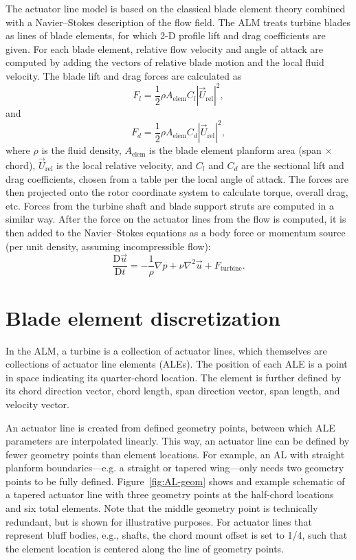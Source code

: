 The actuator line model is based on the classical blade element theory combined
with a Navier--Stokes description of the flow field. The ALM treats turbine
blades as lines of blade elements, for which 2-D profile lift and drag
coefficients are given. For each blade element, relative flow velocity and angle
of attack are computed by adding the vectors of relative blade motion and the
local fluid velocity. The blade lift and drag forces are calculated as
\begin{equation}
    F_l = \frac{1}{2} \rho A_\mathrm{elem} C_l |\vec{U}_\mathrm{rel}|^2,
\end{equation}
and
\begin{equation}
    F_d = \frac{1}{2} \rho A_\mathrm{elem} C_d |\vec{U}_\mathrm{rel}|^2,
\end{equation}
where $\rho$ is the fluid density, $A_\mathrm{elem}$ is the blade element
planform area (span $\times$ chord), $\vec{U}_\mathrm{rel}$ is the local
relative velocity, and $C_l$ and $C_d$ are the sectional lift and drag
coefficients, chosen from a table per the local angle of attack. The forces are
then projected onto the rotor coordinate system to calculate torque, overall
drag, etc. Forces from the turbine shaft and blade support struts are computed
in a similar way. After the force on the actuator lines from the flow is
computed, it is then added to the Navier--Stokes equations as a body force or
momentum source (per unit density, assuming incompressible flow):
\begin{equation}
    \frac{\mathrm{D} \vec{u}}{\mathrm{D} t} = - \frac{1}{\rho} \nabla p + \nu
    \nabla^2 \vec{u} + F_\mathrm{turbine}.
\end{equation}


\section{Blade element discretization}

In the ALM, a turbine is a collection of actuator lines, which themselves are
collections of actuator line elements (ALEs). The position of each ALE is a
point in space indicating its quarter-chord location. The element is further
defined by its chord direction vector, chord length, span direction vector, span
length, and velocity vector.

An actuator line is created from defined geometry points, between which ALE
parameters are interpolated linearly. This way, an actuator line can be defined
by fewer geometry points than element locations. For example, an AL with
straight planform boundaries---e.g. a straight or tapered wing---only needs two
geometry points to be fully defined. Figure~\ref{fig:AL-geom} shows and example
schematic of a tapered actuator line with three geometry points at the
half-chord locations and six total elements. Note that the middle geometry point
is technically redundant, but is shown for illustrative purposes. For actuator
lines that represent bluff bodies, e.g., shafts, the chord mount offset is set
to 1/4, such that the element location is centered along the line of geometry
points.

